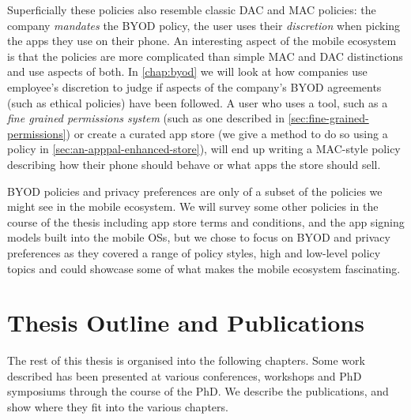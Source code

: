 \documentclass[thesis.tex]{subfiles}
\begin{document}
Superficially these policies also resemble classic DAC and MAC
policies: the company \emph{mandates} the BYOD policy, the user uses
their \emph{discretion} when picking the apps they use on their phone.
An interesting aspect of the mobile ecosystem is that the policies are
more complicated than simple MAC and DAC distinctions and use aspects
of both.  In \autoref{chap:byod} we will look at how companies use
employee's discretion to judge if aspects of the company's BYOD
agreements (such as ethical policies) have been followed.  A user who
uses a tool, such as a \emph{fine grained permissions system} (such as
one described in \autoref{sec:fine-grained-permissions}) or create a
curated app store (we give a method to do so using a policy in
\autoref{sec:an-apppal-enhanced-store}), will end up writing a
MAC-style policy describing how their phone should behave or what apps
the store should sell.

BYOD policies and privacy preferences are only of a subset of the
policies we might see in the mobile ecosystem.  We will survey some
other policies in the course of the thesis including app store terms
and conditions, and the app signing models built into the mobile OSs,
but we chose to focus on BYOD and privacy preferences as they covered
a range of policy styles, high and low-level policy topics and could
showcase some of what makes the mobile ecosystem fascinating.

\section{Thesis Outline and Publications}

The rest of this thesis is organised into the following chapters.
Some work described has been presented at various conferences, workshops and PhD symposiums through the course of the PhD.
We describe the publications, and show where they fit into the various chapters.
\end{document}
